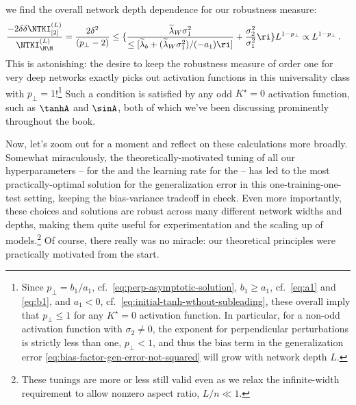 we find the overall network depth dependence for our robustness measure:
\begin{align}\label{eq:robustness-k-star-sol}
\frac{-2\delta\delta \NTKI_{[2]}^{(L)}}{\NTKI_{\M\M}^{(L)}}&=\frac{2\delta^2}{(p_\perp-2)}\le\{
\frac{\widetilde{\lambda}_W\sigma_1^2}{\le[\widetilde{\lambda}_b+(\widetilde{\lambda}_W\sigma_1^2)/(-a_1)\ri]}
+ \frac{\sigma_2^2}{\sigma_1^2} \ri\}L^{1-p_{\perp}}\propto L^{1-p_{\perp}} \, .
\end{align}
This is astonishing: the desire to keep the robustness measure of order one for very deep networks exactly picks out activation functions in this universality class with $p_{\perp}=1$!\footnote{\label{foot:p-perp-less-than-or-equal-to-zero}Since $p_\perp = b_1 / a_1$, cf.~\eqref{eq:perp-asymptotic-solution}, $b_1 \geq a_1$, cf.~\eqref{eq:a1} and \eqref{eq:b1}, and $a_1 <0$,
    cf.~\eqref{eq:initial-tanh-wthout-subleading}, these  overall imply that $p_\perp \leq 1$ for any $K^\star=0$ activation function. In particular, for a non-odd activation function with $\sigma_2\ne 0$, the exponent for perpendicular perturbations is strictly less than one, $p_{\perp}<1$, and thus the bias term in the generalization error \eqref{eq:bias-factor-gen-error-not-squared} will grow with network depth $L$. %
} Such a condition is satisfied by any odd $K^\star=0$ activation function, such as $\tanhA$ and $\sinA$, both of which we've been discussing prominently throughout the book. %







Now, let's zoom out for a moment and reflect on these calculations more broadly. Somewhat miraculously, the theoretically-motivated tuning of all our hyperparameters --  for the  and the learning rate  for the  -- has led to the most practically-optimal solution for the generalization error in this one-training-one-test setting, keeping the bias-variance tradeoff in check. Even more importantly, these choices and solutions are robust across many different network widths and depths, making them quite useful for experimentation and the scaling up of models.\footnote{These tunings are more or less still valid even as we relax the infinite-width requirement to allow nonzero aspect ratio, $L/n \ll 1$.
}
Of course, there really was no miracle: our theoretical principles were practically motivated from the start. 


